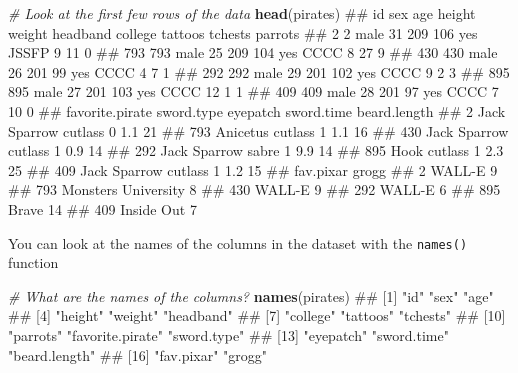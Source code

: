 \documentclass[]{book}
\newenvironment{Shaded}{\begin{snugshade}}{\end{snugshade}}
\newcommand{\KeywordTok}[1]{\textcolor[rgb]{0.13,0.29,0.53}{\textbf{{#1}}}}
\newcommand{\CommentTok}[1]{\textcolor[rgb]{0.56,0.35,0.01}{\textit{{#1}}}}
\newcommand{\NormalTok}[1]{{#1}}
\theoremstyle{definition}
\theoremstyle{definition}
\theoremstyle{remark}
\begin{document}
\begin{Shaded}
\begin{Highlighting}[]
\CommentTok{# Look at the first few rows of the data}
\KeywordTok{head}\NormalTok{(pirates)}
\NormalTok{##      id  sex age height weight headband college tattoos tchests parrots}
\NormalTok{## 2     2 male  31    209    106      yes   JSSFP       9      11       0}
\NormalTok{## 793 793 male  25    209    104      yes    CCCC       8      27       9}
\NormalTok{## 430 430 male  26    201     99      yes    CCCC       4       7       1}
\NormalTok{## 292 292 male  29    201    102      yes    CCCC       9       2       3}
\NormalTok{## 895 895 male  27    201    103      yes    CCCC      12       1       1}
\NormalTok{## 409 409 male  28    201     97      yes    CCCC       7      10       0}
\NormalTok{##     favorite.pirate sword.type eyepatch sword.time beard.length}
\NormalTok{## 2      Jack Sparrow    cutlass        0        1.1           21}
\NormalTok{## 793        Anicetus    cutlass        1        1.1           16}
\NormalTok{## 430    Jack Sparrow    cutlass        1        0.9           14}
\NormalTok{## 292    Jack Sparrow      sabre        1        9.9           14}
\NormalTok{## 895            Hook    cutlass        1        2.3           25}
\NormalTok{## 409    Jack Sparrow    cutlass        1        1.2           15}
\NormalTok{##               fav.pixar grogg}
\NormalTok{## 2                WALL-E     9}
\NormalTok{## 793 Monsters University     8}
\NormalTok{## 430              WALL-E     9}
\NormalTok{## 292              WALL-E     6}
\NormalTok{## 895               Brave    14}
\NormalTok{## 409          Inside Out     7}
\end{Highlighting}
\end{Shaded}

You can look at the names of the columns in the dataset with the
\texttt{names()} function

\begin{Shaded}
\begin{Highlighting}[]
\CommentTok{# What are the names of the columns?}
\KeywordTok{names}\NormalTok{(pirates)}
\NormalTok{##  [1] "id"              "sex"             "age"            }
\NormalTok{##  [4] "height"          "weight"          "headband"       }
\NormalTok{##  [7] "college"         "tattoos"         "tchests"        }
\NormalTok{## [10] "parrots"         "favorite.pirate" "sword.type"     }
\NormalTok{## [13] "eyepatch"        "sword.time"      "beard.length"   }
\NormalTok{## [16] "fav.pixar"       "grogg"}
\end{Highlighting}
\end{Shaded}
\end{document}
